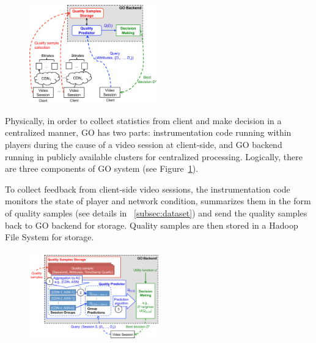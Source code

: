 \begin{figure}[h!]
\centering
 \includegraphics[width=0.5\textwidth] {figures/go-overview.pdf}
\label{fig:go-overview}
\end{figure}

 Physically, in order to collect statistics from client and make decision in a centralized manner, GO has two parts: instrumentation code running within players during the cause of a video session at client-side, and GO backend running in publicly available clusters for centralized processing. Logically, there are three components of GO system (see Figure~\ref{fig:go-overview}). 

 To collect feedback from client-side video sessions, the instrumentation code monitors the state of player and network condition, summarizes them in the form of quality samples (see details in \Section~\ref{subsec:dataset}) and send the quality samples back to GO backend for storage. Quality samples are then stored in a Hadoop File System for storage. 

\begin{figure}[h!]
\centering
 \includegraphics[width=0.5\textwidth] {figures/backend.pdf}
\label{fig:backend}
\end{figure}

